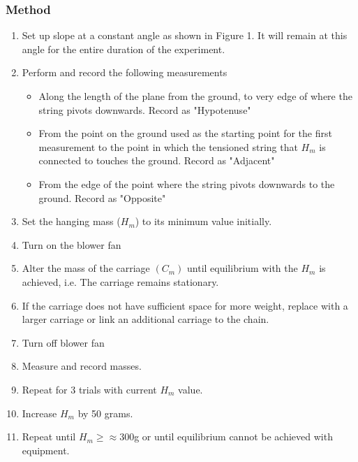\documentclass[11pt,a4paper]{article}
\begin{document}
\subsubsection{Method}
\begin{enumerate}
\item Set up slope at a constant angle as shown in Figure 1. It will remain at this angle for the entire duration of the experiment. 
\item Perform and record the following measurements
\begin{itemize}
	\item Along the length of the plane from the ground, to very edge of where the string pivots downwards. Record as "Hypotenuse"
	\item From the point on the ground used as the starting point for the first measurement to the point in which the tensioned string that $H_m$ is connected to touches the ground. Record as "Adjacent"
	\item From the edge of the point where the string pivots downwards to the ground. Record as "Opposite"
	
\end{itemize}
\item Set the hanging mass ($H_m$) to its minimum value initially.
\item Turn on the blower fan
\item Alter the mass of the carriage $(C_m)$ until equilibrium with the $H_m$ is achieved, i.e. The carriage remains stationary. 
\item If the carriage does not have sufficient space for more weight, replace with a larger carriage or link an additional carriage to the chain.  
\item Turn off blower fan
\item Measure and record masses. 
\item Repeat for 3 trials with current $H_m$ value.
\item Increase $H_m$ by 50 grams. 
\item Repeat until $H_m\geq\approx 300$g or until equilibrium cannot be achieved with equipment.
\end{enumerate}
\end{document}
